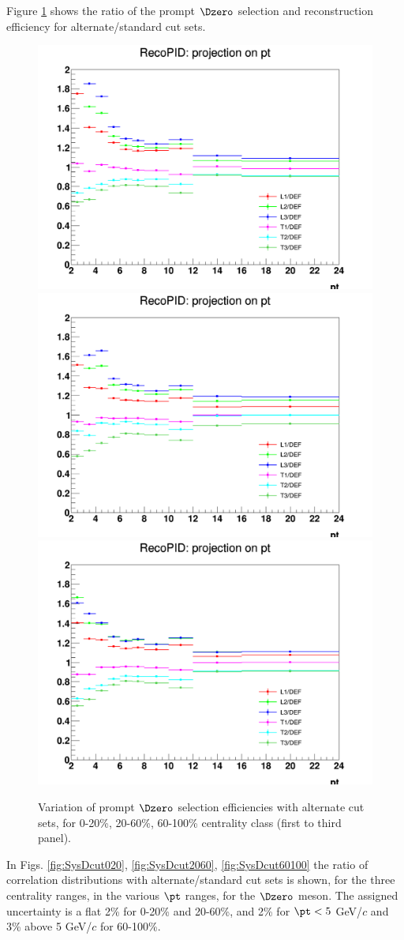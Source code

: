 Figure \ref{fig:EffVariations} shows the ratio of the prompt $\Dzero$ selection and reconstruction efficiency for alternate/standard cut sets.

\begin{figure}
\centering
{\includegraphics[width=0.48\linewidth]{figuresVsCent/Dzero/SystDcuts/CutVarEff_020.png}}
{\includegraphics[width=0.48\linewidth]{figuresVsCent/Dzero/SystDcuts/CutVarEff_2060.png}}
{\includegraphics[width=0.48\linewidth]{figuresVsCent/Dzero/SystDcuts/CutVarEff_60100.png}}
\caption{Variation of prompt $\Dzero$ selection efficiencies with alternate cut sets, for 0-20\%, 20-60\%, 60-100\% centrality class (first to third panel).}
\label{fig:EffVariations}
\end{figure}

In Figs. \ref{fig:SysDcut020}, \ref{fig:SysDcut2060}, \ref{fig:SysDcut60100} the ratio of correlation distributions with alternate/standard cut sets is shown, for the three centrality ranges, in the various $\pt$ ranges, for the $\Dzero$ meson.
The assigned uncertainty is a flat 2\% for 0-20\% and 20-60\%, and 2\% for $\pt < 5$ GeV/$c$ and 3\% above 5 GeV/$c$ for 60-100\%.

